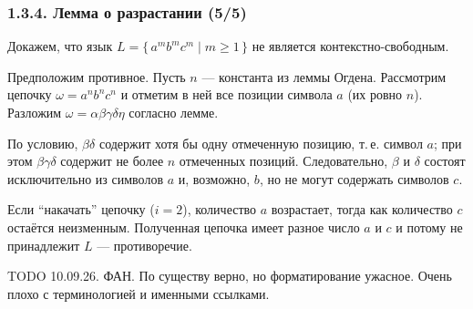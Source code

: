\documentclass[mathserif,12pt,aspectratio=169]{beamer}
\let\ge\geqslant
\def\TODO#1{{\color{gray} TODO {#1}}}
\begin{document}
\begin{frame}
  \frametitle{1.3.4. Лемма о разрастании (5/5)}

  \begin{example}
    Докажем, что язык
    $L = \{\, a^m b^m c^m \mid m\ge 1 \,\}$
    не является контекстно-свободным.

    Предположим противное.  Пусть $n$ — константа из леммы Огдена.
    Рассмотрим цепочку $\omega = a^n b^n c^n$ и отметим в ней все позиции
    символа $a$ (их ровно $n$).
    Разложим $\omega = \alpha\beta\gamma\delta\eta$ согласно лемме.

    По условию, $\beta\delta$ содержит хотя бы одну отмеченную позицию,
    т.\,е. символ $a$; при этом $\beta\gamma\delta$ содержит не более $n$
    отмеченных позиций.  Следовательно, $\beta$ и $\delta$ состоят
    исключительно из символов $a$ и, возможно, $b$, но не могут содержать
    символов $c$.

    Если ``накачать'' цепочку ($i=2$), количество $a$ возрастает, тогда как
    количество $c$ остаётся неизменным.  Полученная цепочка имеет
    разное число $a$ и $c$ и потому не принадлежит $L$ — противоречие.
  \end{example}

\TODO{10.09.26. ФАН. По существу верно, но форматирование ужасное. Очень плохо с терминологией и именными ссылками.}

\end{frame}
\end{document}
